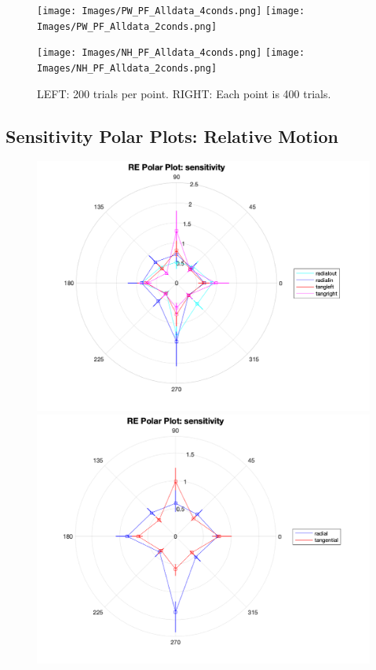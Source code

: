 \documentclass[11pt]{article} %
\begin{document}
\begin{figure}[H]
\centering %
\texttt{[image: Images/PW\_PF\_Alldata\_4conds.png]}
\texttt{[image: Images/PW\_PF\_Alldata\_2conds.png]}
\end{figure}
\begin{figure}[H]
\centering %
\texttt{[image: Images/NH\_PF\_Alldata\_4conds.png]}
\texttt{[image: Images/NH\_PF\_Alldata\_2conds.png]}
\caption{LEFT: 200 trials per point. RIGHT: Each point is 400 trials.}
\end{figure}

\newpage
\subsection{Sensitivity Polar Plots: Relative Motion}
\begin{figure}[H]
\centering %
\includegraphics[scale=.3]{Images/RE_PP_sensitivity_Alldata_4conds.png}
\includegraphics[scale=.3]{Images/RE_PP_sensitivity_Alldata_2conds.png}
\end{figure}
\end{document}
